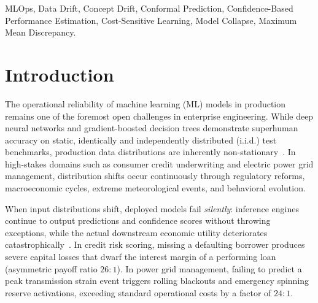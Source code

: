 \documentclass[conference]{IEEEtran}
\begin{document}
\begin{abstract}
We evaluate the platform on 30,000 credit records from the UCI benchmark across five quarters ($T_0$--$T_4$) and validate cross-domain generalizability on 21,887 meteorological sensor records from Open-Meteo for electric grid strain prediction. Across 34 byte-identical algorithmic core files and 20 domain adapters, our 5-seed audit demonstrates that: (a) boundary point masses in tabular credit features inflate KS statistics ($D_{KS}=0.2330, p=3.47 \times 10^{-143}$) while quantile-binned PSI ($0.0055$) and RBF MMD ($0.00698$) preserve false-alarm immunity; (b) under structural concept drift ($T_4$), CBPE exhibits total blindness (accuracy error $\Delta=+0.1796$, AUC error $\Delta=+0.1096$), but Conformal Prediction exposes the shift via severe coverage collapse ($90.97\% \to 76.21\%$ in FinTech, $88.55\% \to 69.39\%$ in Weather); and (c) retraining window dynamics follow a regime-dependent law where balanced 50/50 windows minimize covariate shock ($+6.02\%$ ROI, $+\$111,400$), whereas pure drift windows are strictly required under concept drift, collapsing ECE ($0.1937 \to 0.0222$) and netting $+\$344,550$ in FinTech and $+\$1,383,370$ in grid reliability.
\end{abstract}

\begin{IEEEkeywords}
MLOps, Data Drift, Concept Drift, Conformal Prediction, Confidence-Based Performance Estimation, Cost-Sensitive Learning, Model Collapse, Maximum Mean Discrepancy.
\end{IEEEkeywords}

\section{Introduction}
The operational reliability of machine learning (ML) models in production remains one of the foremost open challenges in enterprise engineering. While deep neural networks and gradient-boosted decision trees demonstrate superhuman accuracy on static, identically and independently distributed (i.i.d.) test benchmarks, production data distributions are inherently non-stationary~\cite{gama2014survey, lu2019learning}. In high-stakes domains such as consumer credit underwriting and electric power grid management, distribution shifts occur continuously through regulatory reforms, macroeconomic cycles, extreme meteorological events, and behavioral evolution. 

When input distributions shift, deployed models fail \textit{silently}: inference engines continue to output predictions and confidence scores without throwing exceptions, while the actual downstream economic utility deteriorates catastrophically~\cite{rabanser2019failing}. In credit risk scoring, missing a defaulting borrower produces severe capital losses that dwarf the interest margin of a performing loan (asymmetric payoff ratio $26:1$). In power grid management, failing to predict a peak transmission strain event triggers rolling blackouts and emergency spinning reserve activations, exceeding standard operational costs by a factor of $24:1$.
\end{document}
